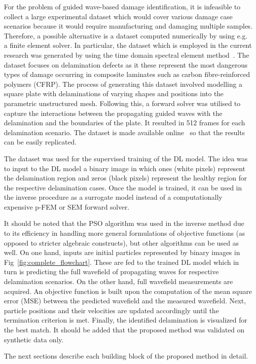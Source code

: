 For the problem of guided wave-based damage identification, it is infeasible to 
collect a large experimental dataset which would cover various damage case 
scenarios because it would require manufacturing and damaging multiple samples.
Therefore, a possible alternative is a dataset computed numerically by using 
e.g. a finite element solver.
In particular, the dataset which is employed in the current research was generated by using the time domain spectral element method~\cite{Kudela2020}.
The dataset focuses on delamination defects as it these represent the most 
dangerous types of damage occurring in composite laminates such as carbon 
fibre-reinforced polymers (CFRP).
The process of generating this dataset involved modelling a square plate with delaminations of varying shapes and positions into the parametric unstructured mesh. 
Following this, a forward solver was utilised to capture the interactions between the propagating guided waves with the delamination and the boundaries of the plate.
It resulted in 512 frames for each delamination scenario.
The dataset is made available online~\cite{kudela_pawel_2021_5414555} so that 
the results can be easily replicated.

The dataset was used for the supervised training of the DL model.
The idea was to input to the DL model a binary image in which ones (white pixels) represent  the delamination region and zeros (black pixels) represent the healthy region for the respective delamination cases.
Once the model is trained, it can be used in the inverse procedure as a surrogate model instead of a computationally expensive p-FEM or SEM forward solver.

It should be noted that the PSO algorithm was used in the inverse method due to 
its efficiency in handling more general formulations of objective functions (as 
opposed to stricter algebraic constructs), but other algorithms can be used as 
well. 
On one hand, inputs are initial particles represented by binary images in Fig~\ref{fig:complete_flowchart}.
These are fed to the trained DL model which in turn is predicting the full wavefield of propagating waves for respective delamination scenarios.
On the other hand, full wavefield measurements are acquired. 
An objective function is built upon the computation of the mean square error (MSE) between the predicted wavefield and the measured wavefield.
Next, particle positions and their velocities are updated accordingly until the termination criterion is met.
Finally, the identified delamination is visualized for the best match.
It should be added that the proposed method was validated on synthetic data only. 

The next sections describe each building block of the proposed method in detail.

